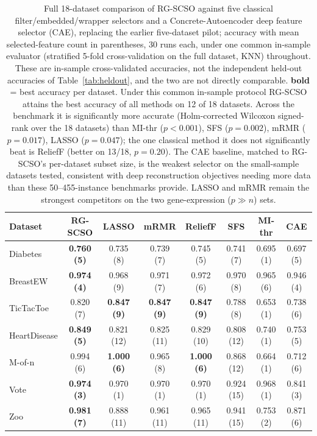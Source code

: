 \documentclass[preprint,3p,times]{elsarticle}
\begin{document}
\begin{table}[!tbp]
\centering
\caption{Full 18-dataset comparison of RG-SCSO against five classical filter/embedded/wrapper selectors and a Concrete-Autoencoder deep feature selector (CAE), replacing the earlier five-dataset pilot; accuracy with mean selected-feature count in parentheses, 30 runs each, under one common in-sample evaluator (stratified 5-fold cross-validation on the full dataset, KNN) throughout. These are in-sample cross-validated accuracies, not the independent held-out accuracies of Table~\ref{tab:heldout}, and the two are not directly comparable. \textbf{bold} = best accuracy per dataset. Under this common in-sample protocol RG-SCSO attains the best accuracy of all methods on 12 of 18 datasets. Across the benchmark it is significantly more accurate (Holm-corrected Wilcoxon signed-rank over the 18 datasets) than MI-thr ($p<0.001$), SFS ($p=0.002$), mRMR ($p=0.017$), LASSO ($p=0.047$); the one classical method it does not significantly beat is ReliefF (better on 13/18, $p=0.20$). The CAE baseline, matched to RG-SCSO's per-dataset subset size, is the weakest selector on the small-sample datasets tested, consistent with deep reconstruction objectives needing more data than these 50--455-instance benchmarks provide. LASSO and mRMR remain the strongest competitors on the two gene-expression ($p\gg n$) sets.}
\label{tab:classic}
\scriptsize
\setlength{\tabcolsep}{3pt}
\begin{tabular}{lccccccc}
\toprule
Dataset & RG-SCSO & LASSO & mRMR & ReliefF & SFS & MI-thr & CAE \\
\midrule
Diabetes & \textbf{0.760 (5)} & 0.735 (8) & 0.739 (7) & 0.745 (5) & 0.741 (7) & 0.695 (1) & 0.697 (5) \\
BreastEW & \textbf{0.974 (4)} & 0.968 (9) & 0.971 (7) & 0.972 (6) & 0.970 (8) & 0.965 (6) & 0.946 (4) \\
TicTacToe & 0.820 (7) & \textbf{0.847 (9)} & \textbf{0.847 (9)} & \textbf{0.847 (9)} & 0.788 (8) & 0.653 (1) & 0.738 (6) \\
HeartDisease & \textbf{0.849 (5)} & 0.821 (12) & 0.825 (11) & 0.829 (10) & 0.808 (12) & 0.740 (1) & 0.753 (5) \\
M-of-n & 0.994 (6) & \textbf{1.000 (6)} & 0.965 (8) & \textbf{1.000 (6)} & 0.868 (12) & 0.664 (1) & 0.712 (6) \\
Vote & \textbf{0.974 (3)} & 0.970 (1) & 0.970 (1) & 0.970 (1) & 0.924 (15) & 0.968 (1) & 0.841 (3) \\
Zoo & \textbf{0.981 (7)} & 0.888 (11) & 0.961 (11) & 0.965 (11) & 0.941 (15) & 0.753 (2) & 0.871 (6) \\

\end{tabular}
\end{table}
\end{document}

